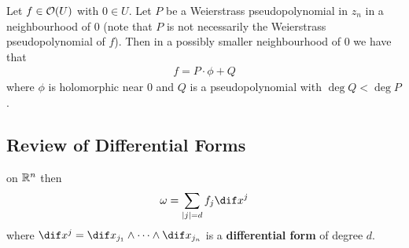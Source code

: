 \begin{theorem}
    Let $f \in \mathcal{O}(U)$ with $0 \in U$. Let $P $ be a Weierstrass pseudopolynomial in $z_n$ in a neighbourhood of $0$ (note that $P$ is not necessarily the Weierstrass pseudopolynomial of $f$). Then in a possibly smaller neighbourhood of $0$ we have that
    \begin{align*}
        f = P \cdot \phi + Q
    \end{align*}
    where $\phi $ is holomorphic near $0$ and $Q$ is a pseudopolynomial with $\deg Q < \deg P$.
\end{theorem}

\subsection{Review of Differential Forms}

\begin{definition}
    on $\mathbb{R}^n$ then
    \begin{align*}
        \omega = \sum_{|j| = d} f_j \dif x^j
    \end{align*}
    where $\dif x^j = \dif x_{j_1} \wedge \cdots \wedge \dif x_{j_n}$ is a \textbf{differential form} of degree $d$.
\end{definition}

